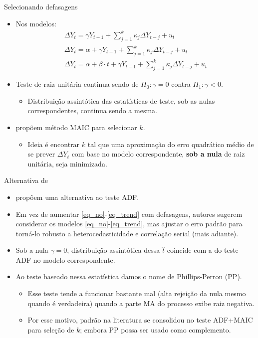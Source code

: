 \documentclass[11pt]{beamer}
\begin{document}
\begin{frame}{Selecionando defasagens}
		\begin{itemize}
			\item Nos modelos:
			\begin{equation}
				\tag{5}
		\begin{aligned}
			\Delta Y_t = \gamma Y_{t-1}  +\sum_{j=1}^k \kappa_j \Delta Y_{t-j} + u_t \\
			\Delta Y_t = \alpha + \gamma Y_{t-1}  +\sum_{j=1}^k \kappa_j \Delta Y_{t-j} + u_t
			\\
			\Delta Y_t = \alpha + \beta \cdot t + \gamma Y_{t-1} +  \sum_{j=1}^k\kappa_j \Delta Y_{t-j} + u_t
		\end{aligned}
	\end{equation}

			\item Teste de raiz unitária continua sendo de $H_0: \gamma = 0$ contra $H_1: \gamma < 0$.
			\begin{itemize}
				\vspace{-1em}
				\item Distribuição assintótica das estatísticas de teste, sob as nulas correspondentes, continua sendo a mesma.
			\end{itemize}
		\item \citet{Ng2001} propõem método MAIC para selecionar $k$.
		\begin{itemize}
			\item Ideia é encontrar $k$ tal que uma aproximação do erro quadrático médio de se prever $\Delta Y_t$ com base no modelo correspondente, \textbf{sob a nula} de raiz unitária, seja minimizada.
		\end{itemize}
	\end{itemize}
\end{frame}
\begin{frame}{Alternativa de \citet{Phillips1988}}
	\begin{itemize}
		\item \citet{Phillips1988} propõem uma alternativa ao teste ADF.
		\item Em vez de aumentar \eqref{eq_no}-\eqref{eq_trend} com defasagens, autores sugerem considerar os modelos \eqref{eq_no}-\eqref{eq_trend}, mas ajustar o erro padrão para torná-lo robusto a heterocedasticidade e correlação serial (mais adiante).
		\item Sob a nula $\gamma = 0$, distribuição assintótica dessa $\hat{t}$ coincide com a do teste ADF no modelo correspondente.
		\item Ao teste baseado nessa estatística damos o nome de Phillips-Perron (PP).
		\begin{itemize}
			\item Esse teste tende a funcionar bastante mal (alta rejeição da nula mesmo quando é verdadeira) quando a parte MA do processo exibe raiz negativa.
			\item Por esse motivo, padrão na literatura se consolidou no teste ADF+MAIC para seleção de $k$; embora PP possa ser usado como complemento.
		\end{itemize} 
		
	\end{itemize}
\end{frame}
\end{document}
